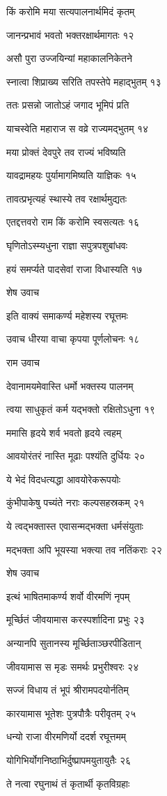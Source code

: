 किं करोमि मया सत्यपालनार्थमिदं कृतम्

जानन्प्रभावं भवतो भक्तरक्षार्थमागतः १२

असौ पुरा उज्जयिन्यां महाकालनिकेतने

स्नात्वा शिप्राख्य सरिति तपस्तेपे महाद्भुतम् १३

ततः प्रसन्नो जातोऽहं जगाद भूमिपं प्रति

याचस्वेति महाराज स वव्रे राज्यमद्भुतम् १४

मया प्रोक्तं देवपुरे तव राज्यं भविष्यति

यावद्रामहयः पुर्यामागमिष्यति याज्ञिकः १५

तावत्प्रभृत्यहं स्थास्ये तव रक्षार्थमुद्यतः

एतद्दत्तवरो राम किं करोमि स्वसत्यतः १६

घृणितोऽस्म्यधुना राज्ञा सपुत्रपशुबांधवः

हयं समर्प्यते पादसेवां राजा विधास्यति १७

शेष उवाच

इति वाक्यं समाकर्ण्य महेशस्य रघूत्तमः

उवाच धीरया वाचा कृपया पूर्णलोचनः १८

राम उवाच

देवानामयमेवास्ति धर्मो भक्तस्य पालनम्

त्वया साधुकृतं कर्म यद्भक्तो रक्षितोऽधुना १९

ममासि हृदये शर्व भवतो हृदये त्वहम्

आवयोरंतरं नास्ति मूढाः पश्यंति दुर्धियः २०

ये भेदं विदधत्यद्धा आवयोरेकरूपयोः

कुंभीपाकेषु पच्यंते नराः कल्पसहस्रकम् २१

ये त्वद्भक्तास्त एवासन्मद्भक्ता धर्मसंयुताः

मद्भक्ता अपि भूयस्या भक्त्या तव नतिंकराः २२

शेष उवाच

इत्थं भाषितमाकर्ण्य शर्वो वीरमणिं नृपम्

मूर्च्छितं जीवयामास करस्पर्शादिना प्रभुः २३

अन्यानपि सुतानस्य मूर्च्छिताञ्छरपीडितान्

जीवयामास स मृडः समर्थः प्रभुरीश्वरः २४

सज्जं विधाय तं भूपं श्रीरामपदयोर्नतिम्

कारयामास भूतेशः पुत्रपौत्रैः परीवृतम् २५

धन्यो राजा वीरमणिर्यो ददर्श रघूत्तमम्

योगिभिर्योगनिष्ठाभिर्दुष्प्रापमयुतायुतैः २६

ते नत्वा रघुनाथं तं कृतार्थी कृतविग्रहाः

